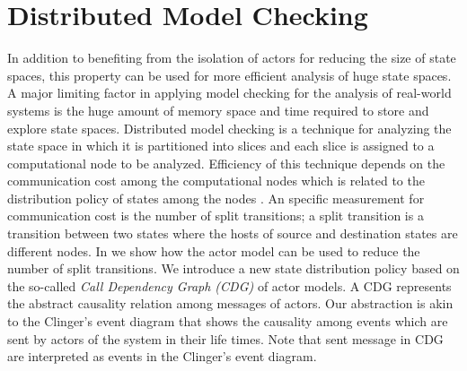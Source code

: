\section{Distributed Model Checking} \label{sec::DMC}
In addition to benefiting from the isolation of actors for reducing the size of state spaces, this property can be used for more efficient analysis of huge state spaces. A major limiting factor in applying model checking for the analysis of real-world systems is the huge amount of memory space and time required to store and explore state spaces. Distributed model checking is a technique for analyzing the state space in which it is partitioned into slices and each slice is assigned to a computational node to be analyzed. Efficiency of this technique depends on the communication cost among the computational nodes which is related to the distribution policy of states among the nodes \cite{DBLP:journals/entcs/OrzanPE05}.
%
An specific measurement for communication cost is the number of split transitions; a split transition is a transition between two states where the hosts of source and destination states are different nodes. In \cite{DBLP:journals/eceasst/KhamespanahSMSR15} we show how the actor model can be used to reduce the number of split transitions. We introduce a new state distribution policy based on the so-called \textit{Call Dependency Graph (CDG)} of actor models. A CDG represents the abstract causality relation among messages of actors. Our abstraction is akin to the Clinger's event diagram \cite{clinger} that shows the causality among events which are sent by actors of the system in their life times. Note that sent message in CDG are interpreted as events in the Clinger's event diagram.

